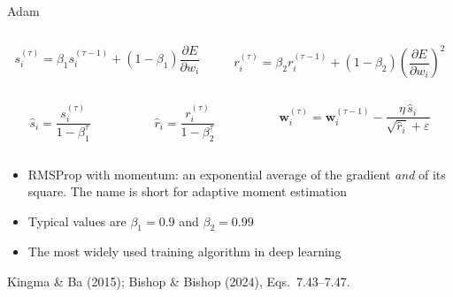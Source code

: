 \documentclass[aspectratio=169, 11pt]{beamer}
\newcommand{\srcline}[1]{%
  \par\vspace{0.25em}%
  {\scriptsize\color{mcMuted}\hfill #1\par}}
\newcommand{\src}[3]{}      %
\begin{document}
\begin{frame}{Adam}
  \src{bishop2024}{equation}{7.43-7.47}
  \src{bishop2024}{section}{7.3.3}
  \src{kingma2015}{algorithm}{1}
  \vspace{-0.55em}
  \begin{columns}[T, onlytextwidth]
    \begin{column}{0.485\textwidth}
      \[ s^{(\tau)}_i = \beta_1 s^{(\tau-1)}_i
         + (1-\beta_1)\frac{\partial E}{\partial w_i} \]
    \end{column}
    \begin{column}{0.50\textwidth}
      \[ r^{(\tau)}_i = \beta_2 r^{(\tau-1)}_i
         + (1-\beta_2)\left(\frac{\partial E}{\partial w_i}\right)^{2} \]
    \end{column}
  \end{columns}
  \vspace{-0.55em}
  \begin{columns}[T, onlytextwidth]
    \begin{column}{0.30\textwidth}
      \[ \hat s_i = \frac{s^{(\tau)}_i}{1-\beta_1^{\tau}} \]
    \end{column}
    \begin{column}{0.30\textwidth}
      \[ \hat r_i = \frac{r^{(\tau)}_i}{1-\beta_2^{\tau}} \]
    \end{column}
    \begin{column}{0.38\textwidth}
      \[ \mathbf{w}^{(\tau)}_i = \mathbf{w}^{(\tau-1)}_i
         - \frac{\eta\,\hat s_i}{\sqrt{\hat r_i} + \varepsilon} \]
    \end{column}
  \end{columns}
  \vspace{0.1em}
  \begin{itemize}\itemsep0.3em
    \item RMSProp with momentum: an exponential average of the gradient
          \emph{and} of its square. The name is short for
          \alert{adaptive moment estimation}
    \item Typical values are $\beta_1 = 0.9$ and $\beta_2 = 0.99$
    \item The most widely used training algorithm in deep learning
  \end{itemize}
  \srcline{Kingma \& Ba (2015); Bishop \& Bishop (2024),
  Eqs.~7.43--7.47.}
\end{frame}
\end{document}
